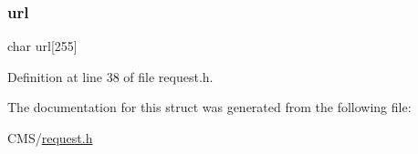 \subsubsection{\texorpdfstring{url}{url}}
{\footnotesize\ttfamily char url\mbox{[}255\mbox{]}}



Definition at line 38 of file request.\+h.



The documentation for this struct was generated from the following file\+:\begin{DoxyCompactItemize}
\item 
C\+M\+S/\mbox{\hyperlink{request_8h}{request.\+h}}\end{DoxyCompactItemize}
